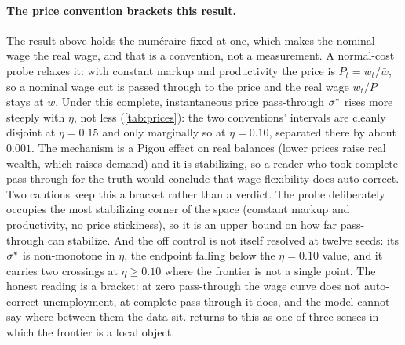 \paragraph{The price convention brackets this result.} The result above holds the
numéraire fixed at one, which makes the nominal wage the real wage, and that is
a convention, not a measurement. A normal-cost probe relaxes it: with constant
markup and productivity the price is $P_t = w_t/\bar w$, so a nominal wage cut is
passed through to the price and the real wage $w_t/P$ stays at $\bar w$. Under this
complete, instantaneous price pass-through $\sigma^{\ast}$ rises more steeply with
$\eta$, not less (\cref{tab:prices}): the two conventions' intervals are cleanly
disjoint at $\eta = 0.15$ and only marginally so at $\eta = 0.10$, separated there
by about $0.001$. The mechanism is a Pigou effect on real balances (lower
prices raise real wealth, which raises demand) and it is stabilizing, so a
reader who took complete pass-through for the truth would conclude that wage
flexibility does auto-correct. Two cautions keep this a bracket rather than
a verdict. The probe deliberately occupies the most stabilizing corner of the
space (constant markup and productivity, no price stickiness), so it is an
upper bound on how far pass-through can stabilize. And the off control is not
itself resolved at twelve seeds: its $\sigma^{\ast}$ is non-monotone in $\eta$, the
endpoint falling below the $\eta = 0.10$ value, and it carries two crossings at
$\eta \ge 0.10$ where the frontier is not a single point. The honest reading is a
bracket: at zero pass-through the wage curve does not auto-correct unemployment,
at complete pass-through it does, and the model cannot say where between them the
data sit.  returns to this as one of three senses in which
the frontier is a local object.

